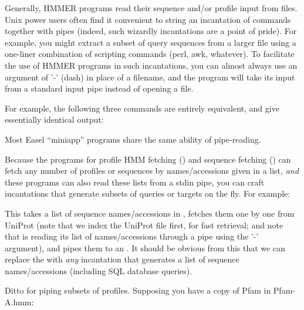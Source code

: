 Generally, HMMER programs read their sequence and/or profile input
from files. Unix power users often find it convenient to string an
incantation of commands together with pipes (indeed, such wizardly
incantations are a point of pride). For example, you might extract a
subset of query sequences from a larger file using a one-liner
combination of scripting commands (perl, awk, whatever). To facilitate
the use of HMMER programs in such incantations, you can almost always
use an argument of '-' (dash) in place of a filename, and the program
will take its input from a standard input pipe instead of opening a
file.

For example, the following three commands are entirely equivalent, and
give essentially identical output:




Most Easel ``miniapp'' programs share the same ability of pipe-reading.

Because the programs for profile HMM fetching () and
sequence fetching () can fetch any number of profiles
or sequences by names/accessions given in a list, \emph{and} these
programs can also read these lists from a stdin pipe, you can craft
incantations that generate subsets of queries or targets on the
fly. For example:


This takes a list of sequence names/accessions in
, fetches them one by one from UniProt (note that
we index the UniProt file first, for fast retrieval; and note that
 is reading its  list of
names/accessions through a pipe using the '-' argument), and pipes
them to an . It should be obvious from this that we
can replace the  with \emph{any} incantation
that generates a list of sequence names/accessions (including SQL
database queries).

Ditto for piping subsets of profiles. Supposing you have a copy of Pfam in Pfam-A.hmm:



